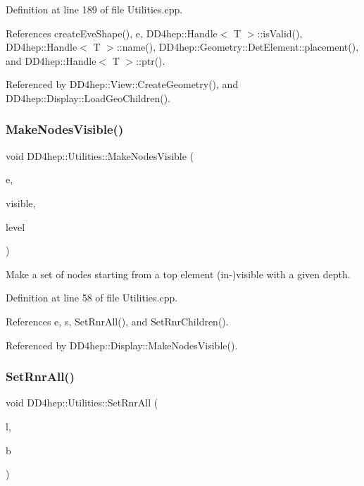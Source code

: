 Definition at line 189 of file Utilities.\+cpp.



References create\+Eve\+Shape(), e, D\+D4hep\+::\+Handle$<$ T $>$\+::is\+Valid(), D\+D4hep\+::\+Handle$<$ T $>$\+::name(), D\+D4hep\+::\+Geometry\+::\+Det\+Element\+::placement(), and D\+D4hep\+::\+Handle$<$ T $>$\+::ptr().



Referenced by D\+D4hep\+::\+View\+::\+Create\+Geometry(), and D\+D4hep\+::\+Display\+::\+Load\+Geo\+Children().

\hypertarget{namespace_d_d4hep_1_1_utilities_a93a4f08ad1e94bdda79153a858ab809b}{}\label{namespace_d_d4hep_1_1_utilities_a93a4f08ad1e94bdda79153a858ab809b} 
\subsubsection{\texorpdfstring{Make\+Nodes\+Visible()}{MakeNodesVisible()}}
{\footnotesize\ttfamily void D\+D4hep\+::\+Utilities\+::\+Make\+Nodes\+Visible (\begin{DoxyParamCaption}\item[{T\+Eve\+Element $\ast$}]{e,  }\item[{bool}]{visible,  }\item[{int}]{level }\end{DoxyParamCaption})}



Make a set of nodes starting from a top element (in-\/)visible with a given depth. 



Definition at line 58 of file Utilities.\+cpp.



References e, s, Set\+Rnr\+All(), and Set\+Rnr\+Children().



Referenced by D\+D4hep\+::\+Display\+::\+Make\+Nodes\+Visible().

\hypertarget{namespace_d_d4hep_1_1_utilities_a92896bc98df5b92fe16f7cfc74716442}{}\label{namespace_d_d4hep_1_1_utilities_a92896bc98df5b92fe16f7cfc74716442} 
\subsubsection{\texorpdfstring{Set\+Rnr\+All()}{SetRnrAll()}}
{\footnotesize\ttfamily void D\+D4hep\+::\+Utilities\+::\+Set\+Rnr\+All (\begin{DoxyParamCaption}\item[{\hyperlink{class_t_eve_element_list}{T\+Eve\+Element\+List} $\ast$}]{l,  }\item[{bool}]{b }\end{DoxyParamCaption})}



